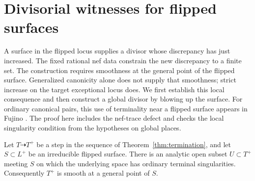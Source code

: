 \section{Divisorial witnesses for flipped surfaces}
\label{sec:witnesses}

A surface in the flipped locus supplies a divisor whose discrepancy has
just increased.  The fixed rational nef data constrain the new discrepancy
to a finite set.  The construction requires smoothness at the general
point of the flipped surface.  Generalized canonicity alone does not
supply that smoothness; strict increase on the target exceptional locus
does.  We first establish this local consequence and then construct a
global divisor by blowing up the surface.
For ordinary canonical pairs, this use of terminality near a flipped
surface appears in Fujino \cite[Lemma~2.2]{Fujino2004}.
The proof here includes the nef-trace defect and checks the local
singularity condition from the hypotheses on global places.

\begin{proposition}
\label{prop:ordinary-terminal}
Let $T\dashrightarrow T^+$ be a step in the sequence of
Theorem~\ref{thm:termination}, and let $S\subset L^+$ be an irreducible
flipped surface.  There is an analytic open subset $U\subset T^+$
meeting $S$ on which the underlying space has ordinary terminal
singularities.  Consequently $T^+$ is smooth at a general point of $S$.
\end{proposition}

